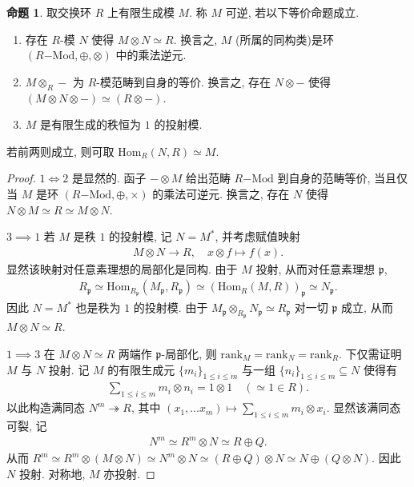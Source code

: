 \documentclass{MainStyle}
\theoremstyle{definition}
\theoremstyle{definition}
\theoremstyle{definition}
\theoremstyle{definition}
\newtheorem{proposition}{命题}
\theoremstyle{definition}
\theoremstyle{definition}
\theoremstyle{definition}
\theoremstyle{remark}
\theoremstyle{remark}
\begin{document}
\begin{proposition}
    取交换环 $R$ 上有限生成模 $M$. 称 $M$ 可逆, 若以下等价命题成立.
    \begin{enumerate}
        \item 存在 $R$-模 $N$ 使得 $M\otimes N\simeq R$. 换言之, $M$ (所属的同构类)是环 $(R\mathrm{-Mod},\oplus,\otimes)$ 中的乘法逆元.
        \item $M\otimes_R-$ 为 $R$-模范畴到自身的等价. 换言之, 存在 $N\otimes-$ 使得 $(M\otimes N\otimes -)\simeq (R\otimes -)$.
        \item $M$ 是有限生成的秩恒为 $1$ 的投射模.
    \end{enumerate}
    若前两则成立, 则可取 $\mathrm{Hom}_R(N,R)\simeq M$.
    \begin{proof}
        $1\Longleftrightarrow 2$ 是显然的. 函子 $-\otimes M$ 给出范畴 $R\mathrm{-Mod}$ 到自身的范畴等价, 当且仅当 $M$ 是环 $(R\mathrm{-Mod},\oplus,\times)$ 的乘法可逆元. 换言之, 存在 $N$ 使得 $N\otimes M\simeq R\simeq M\otimes N$. \par
        $3\implies 1$ 若 $M$ 是秩 $1$ 的投射模, 记 $N=M^\ast$, 并考虑赋值映射
        \begin{align*}
            M\otimes N\to R,\quad x\otimes f\mapsto f(x).
        \end{align*}
        显然该映射对任意素理想的局部化是同构. 由于 $M$ 投射, 从而对任意素理想 $\mathfrak p$,
        \begin{align*}
            R_{\mathfrak p}\simeq \mathrm{Hom}_{R_{\mathfrak p}}(M_{\mathfrak p},R_{\mathfrak p})\simeq (\mathrm{Hom}_R(M,R))_{\mathfrak p}\simeq N_{\mathfrak p}.
        \end{align*}
        因此 $N=M^\ast$ 也是秩为 $1$ 的投射模. 由于 $M_{\mathfrak p}\otimes_{R_\mathfrak p} N_{\mathfrak p}\simeq R_{\mathfrak p}$ 对一切 $\mathfrak p$ 成立, 从而 $M\otimes N\simeq R$.\par
        $1\implies 3$ 在 $M\otimes N\simeq R$ 两端作 $\mathfrak p$-局部化, 则 $\mathrm{rank}_M=\mathrm{rank}_N=\mathrm{rank}_R$. 下仅需证明 $M$ 与 $N$ 投射. 记 $M$ 的有限生成元 $\{m_i\}_{1\leq i\leq m}$ 与一组 $\{n_i\}_{1\leq i\leq m}\subseteq N$ 使得有
        \begin{align*}
            \sum_{1\leq i\leq m}m_i\otimes n_i =1\otimes 1\quad \left(\simeq 1\in R\right).
        \end{align*}
        以此构造满同态 $N^m\twoheadrightarrow R$, 其中 $(x_1,\ldots x_m)\mapsto \sum_{1\leq i\leq m}m_i\otimes x_i$. 显然该满同态可裂, 记
        \begin{align*}
            N^m\simeq R^m\otimes N\simeq R\oplus Q.
        \end{align*}
        从而 $R^m\simeq R^m\otimes (M\otimes N)\simeq N^m\otimes N\simeq (R\oplus Q)\otimes N\simeq N\oplus (Q\otimes N)$. 因此 $N$ 投射. 对称地, $M$ 亦投射.
    \end{proof}
\end{proposition}
\end{document}
